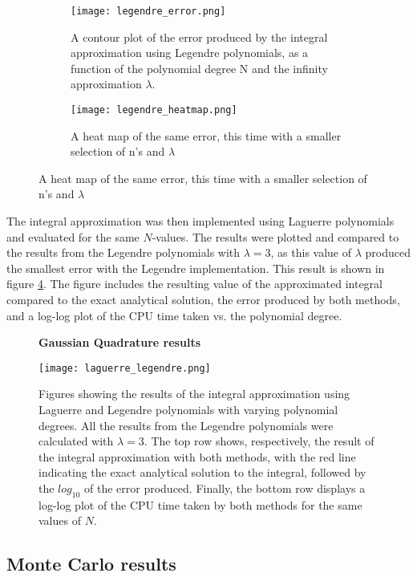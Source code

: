 \documentclass[a4paper,10pt,english]{article}
\begin{document}
\begin{figure}[h!]
  \centering
  \begin{subfigure}[b]{0.45\linewidth}
    \texttt{[image: legendre\_error.png]}
    \caption{A contour plot of the error produced by the integral approximation using Legendre polynomials, as a function of the polynomial degree N and the infinity approximation $\lambda$.}
    \label{fig:legendre_all}
  \end{subfigure}
  \begin{subfigure}[b]{0.45\linewidth}
    \texttt{[image: legendre\_heatmap.png]}
    \caption{A heat map of the same error, this time with a smaller selection of n's and $\lambda$}
    \label{fig:legendre_odd}
  \end{subfigure}
 
\end{figure}

The integral approximation was then implemented using Laguerre polynomials and evaluated for the same $N$-values. The results were plotted and compared to the results from the Legendre polynomials with $\lambda = 3$, as this value of $\lambda$ produced the smallest error with the Legendre implementation. This result is shown in figure \ref{fig:laguerre_legendre}. The figure includes the resulting value of the approximated integral compared to the exact analytical solution, the error produced by both methods, and a log-log plot of the CPU time taken vs. the polynomial degree. 


\begin{figure}
    \centering
    \textbf{Gaussian Quadrature results}\par\medskip

    \texttt{[image: laguerre\_legendre.png]}
    \caption{Figures showing the results of the integral approximation using Laguerre and Legendre polynomials with varying polynomial degrees. All the results from the Legendre polynomials were calculated with $\lambda=3$. The top row shows, respectively, the result of the integral approximation with both methods, with the red line indicating the exact analytical solution to the integral, followed by the $log_{10}$ of the error produced. Finally, the bottom row displays a log-log plot of the CPU time taken by both methods for the same values of $N$.}
    \label{fig:laguerre_legendre}
\end{figure}

\subsection{Monte Carlo results}\label{sec:mc_res}
\end{document}
